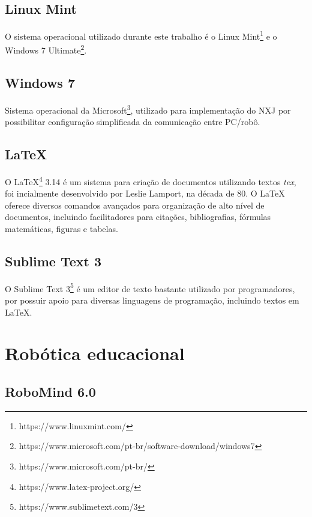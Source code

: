 	\subsection{Linux Mint} %
	\label{sub:linux_mint}
		O sistema operacional utilizado durante este trabalho é o Linux Mint\footnote{https://www.linuxmint.com/} e o Windows 7 Ultimate\footnote{https://www.microsoft.com/pt-br/software-download/windows7}.

	\subsection{Windows 7} %
	\label{sub:windows_7}

		Sistema operacional da Microsoft\footnote{https://www.microsoft.com/pt-br/}, utilizado para implementação do NXJ por possibilitar configuração simplificada da comunicação entre PC/robô.

	\subsection{LaTeX} %
	\label{sub:latex}
	
	O LaTeX\footnote{https://www.latex-project.org/} 3.14 é um sistema para criação de documentos utilizando textos \textit{tex}, foi incialmente desenvolvido por Leslie Lamport, na década de 80. O LaTeX oferece diversos comandos avançados para organização de alto nível de documentos, incluindo facilitadores para citações, bibliografias, fórmulas matemáticas, figuras e tabelas.

	\subsection{Sublime Text 3} %
	\label{sub:sublime_text_3}
		O Sublime Text 3\footnote{https://www.sublimetext.com/3} é um editor de texto bastante utilizado por programadores, por possuir apoio para diversas linguagens de programação, incluindo textos em LaTeX.

\section{Robótica educacional} %
\label{sec:robótica_educacional_suporte}

	\subsection{RoboMind 6.0} %
	\label{sub:robomind}

